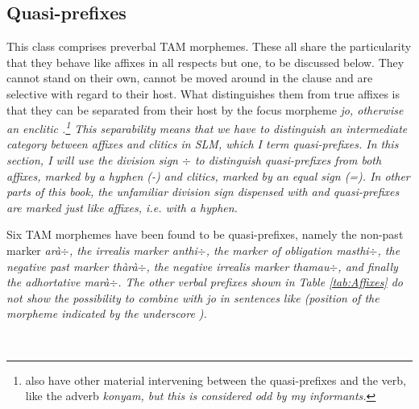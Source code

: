 \subsection{Quasi-prefixes}\label{sec:morph:Quasi-prefixes}
This class comprises  preverbal TAM morphemes. These all share the particularity that they behave like affixes in all respects but one, to be discussed below. They cannot stand on their own, cannot be moved around in the clause and are selective with regard to their host. What distinguishes them from true affixes is that they can be separated from their host by the focus morpheme \em jo\em, otherwise an enclitic \citep[cf.][164]{SmithEtAl2007}.\footnote{\citet{SmithEtAl2007} also have other material intervening between the quasi-prefixes and the verb, like the adverb \em konyam\em, but this is considered odd by my informants.}
This separability means that we have to distinguish an intermediate category between affixes and clitics in SLM, which I term \em quasi-prefixes\em. In this section, I will use the division sign $\div$ to distinguish quasi-prefixes from both affixes, marked by a hyphen (-) and clitics, marked by an equal sign (=). In other parts of this book, the unfamiliar division sign dispensed with and quasi-prefixes are marked just like affixes, i.e. with a hyphen.

Six TAM morphemes have been found to be quasi-prefixes, namely
the non-past marker \em arà$\div$\em,
the irrealis marker \em anthi$\div$, \em
the marker of obligation \em masthi$\div$, \em
the negative past marker \em thàrà$\div$, \em
the negative irrealis marker \em thamau$\div$, \em
and finally the adhortative \em marà$\div$\em. The other verbal prefixes shown in Table \ref{tab:Affixes} do not show the possibility to combine with \em jo \em in sentences like  (position of the morpheme indicated by the underscore \underscore).


 \\


